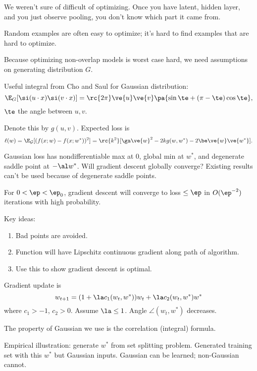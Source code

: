 We weren't sure of difficult of optimizing. Once you have latent, hidden layer, and you just observe pooling, you don't know which part it came from. %

Random examples are often easy to optimize; it's hard to find examples that are hard to optimize.


Because optimizing non-overlap models is worst case hard, we need assumptions on generating distribution $G$.

Useful integral from Cho and Saul for Gaussian distribution:
$$
\E_{G} [\si(u\cdot x)\si(v\cdot x)] = \rc{2\pi }\ve{u}\ve{v}\pa{\sin \te + (\pi - \te)\cos\te},
$$
$\te$ the angle between $u,v$.

Denote this by $g(u,v)$. Expected loss is 
$$
\ell(w) = \E_{\cal G}[(f(x;w) - f(x;w^*))^2]
= \rc{k^2} [\ga\ve{w}^2 - 2k g(w,w^*) - 2\be \ve{w}\ve{w^*}].
$$

Gaussian loss has nondifferentiable max at 0, global min at $w^*$, and degenerate saddle point at $-\al w^*$. 
Will gradient descent globally converge? Existing results can't be used because of degenerate saddle points.

\begin{thm}
For $0<\ep<\ep_0$, gradient descent will converge to loss $\le \ep$ in $O(\ep^{-2})$ iterations with high probability.
\end{thm}

Key ideas:
\begin{enumerate}
\item
Bad points are avoided.
\item
Function will have Lipschitz continuous gradient along path of algorithm.
\item
Use this to show gradient descent is optimal.
\end{enumerate}

Gradient update is
$$
w_{t+1} = (1+\la c_1(w_t,w^*)) w_t + \la c_2(w_t,w^*) w^*
$$
where $c_1>-1$, $c_2>0$. Assume $\la\le 1$.
Angle $\angle(w_t,w^*)$ decreases.

The property of Gaussian we use is the correlation (integral) formula.

Empirical illustration: generate $w^*$ from set splitting problem. Generated training set with this $w^*$ but Gaussian inputs. Gaussian can be learned; non-Gaussian cannot.

